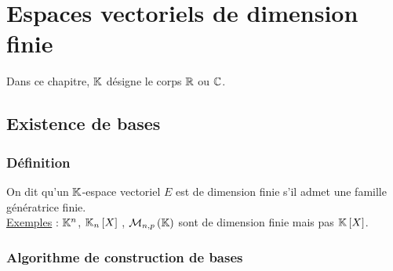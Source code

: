 \chapter{Espaces vectoriels de dimension finie}

\minitoc

Dans ce chapitre, \(\mathbb{K}\) désigne le corps \(\mathbb{R}\) ou \(\mathbb{C}\).

\section{Existence de bases}
\subsection{Définition}
\begin{defi}
    On dit qu’un \(\mathbb{K}\)-espace vectoriel \(E\) est de dimension finie s’il admet une famille génératrice finie. \\
    \underline{Exemples} : \(\mathbb{K}^n\), \(\mathbb{K}_n \left[X\right]\) , \(\M{n,p}\) sont de dimension finie mais pas \(\mathbb{K} \left[X\right]\).
\end{defi}

\subsection{Algorithme de construction de bases}

